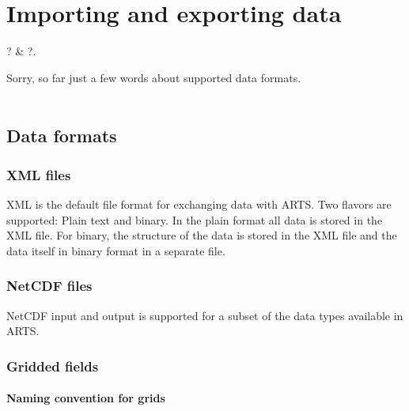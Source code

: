 \chapter{Importing and exporting data}
 \label{sec:inout}


 \starthistory
 ? & ?.\\
 \stophistory

Sorry, so far just a few words about supported data formats.\\ \\



\section{Data formats}

\subsection{XML files}

XML is the default file format for exchanging data with ARTS. Two flavors are
supported: Plain text and binary. In the plain format all data is stored in
the XML file. For binary, the structure of the data is stored in the XML file
and the data itself in binary format in a separate file.

\subsection{NetCDF files}

NetCDF input and output is supported for a subset of the data types available
in ARTS.

\subsection{Gridded fields}

\subsubsection{Naming convention for grids}

\begin{alltt}
\small

\end{alltt}



